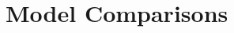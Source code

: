 \documentclass[fignum,nobf,man]{apa}
\begin{document}
%
%


\section{Model Comparisons}
\end{document}
